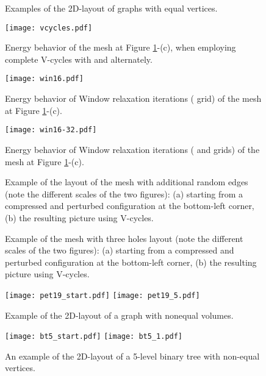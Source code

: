 \documentclass[final]{siamltex}
\begin{document}
\begin{figure}
\begin{center}

\end{center}
\caption{Examples of the 2D-layout of graphs with equal vertices.}
\label{figtest}
\end{figure}

\begin{figure}
\vbox{\center\texttt{[image: vcycles.pdf]}}
\caption{Energy behavior of the mesh at Figure \ref{figtest}-(c),
when employing complete V-cycles with  and  alternately.}\label{vc-conv}
\end{figure}
\begin{figure}
\vbox{\center\texttt{[image: win16.pdf]}}
\caption{Energy behavior of Window relaxation iterations
( grid) of the mesh at Figure
\ref{figtest}-(c).}\label{wr-conv}
\end{figure}
\begin{figure}
\vbox{\center\texttt{[image: win16-32.pdf]}}
\caption{Energy behavior of Window relaxation iterations
( and  grids) of the mesh at Figure
\ref{figtest}-(c).}\label{wrb-conv}
\end{figure}




\begin{figure}
\begin{center}

 \end{center}
  \caption{Example of the layout of the  mesh with additional random edges
  (note the different scales of the two figures):
  (a) starting from a compressed and perturbed configuration at the bottom-left corner,
  (b) the resulting picture using V-cycles.}
  \label{figm64add}
\end{figure}
\begin{figure}
\begin{center}

 \end{center}
  \caption{Example of the  mesh with three holes layout
  (note the different scales of the two figures):
  (a) starting from a compressed and perturbed configuration at the bottom-left corner, (b) the resulting picture using V-cycles.}
  \label{figm64hole}
\end{figure}


\begin{figure}
  \centerline{
    \mbox{\texttt{[image: pet19\_start.pdf]}}
    \mbox{\texttt{[image: pet19\_5.pdf]}}
  }
  \caption{Example of the 2D-layout of a graph with nonequal volumes.}
  \label{figvoltest}
\end{figure}
\begin{figure}
  \centerline{
    \mbox{\texttt{[image: bt5\_start.pdf]}}
    \mbox{\texttt{[image: bt5\_1.pdf]}}
  }
  \caption{An example of the 2D-layout of a 5-level binary tree with non-equal vertices.}
  \label{figvoltest-tree}
\end{figure}
\end{document}
